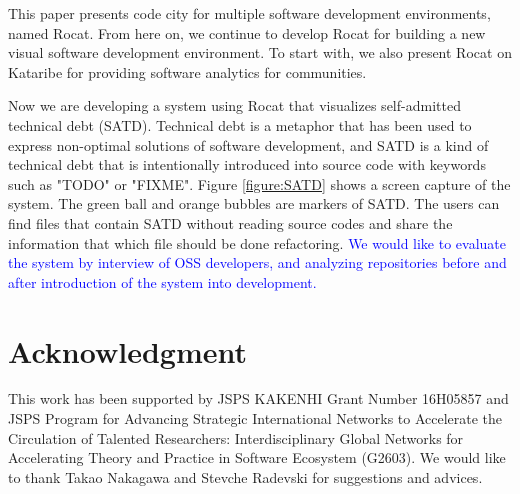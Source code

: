 \documentclass[conference]{IEEEtran}
\newcommand{\figref}[1]{Figure \ref{#1}}
\begin{document}
This paper presents code city for multiple software development environments, named Rocat.
From here on, we continue to develop Rocat for building a new visual software development environment.
To start with, we also present Rocat on Kataribe for providing software analytics for communities.

Now we are developing a system using Rocat that visualizes self-admitted technical debt (SATD).
Technical debt is a metaphor that has been used to express non-optimal solutions of software development, and SATD is a kind of technical debt that is intentionally introduced into source code with keywords such as "TODO" or "FIXME"\cite{6976075}.
\figref{figure:SATD} shows a screen capture of the system.
The green ball and orange bubbles are markers of SATD.
The users can find files that contain SATD without reading source codes and share the information that which file should be done refactoring.
\textcolor{blue}{We would like to evaluate the system by interview of OSS developers, and analyzing repositories before and after introduction of the system into development.}

\section*{Acknowledgment}
This work has been supported by JSPS KAKENHI Grant Number 16H05857 and JSPS Program for Advancing Strategic International Networks to Accelerate the Circulation of Talented Researchers: Interdisciplinary Global Networks for Accelerating Theory and Practice in Software Ecosystem (G2603).
We would like to thank Takao Nakagawa and Stevche Radevski for suggestions and advices.





\end{document}
